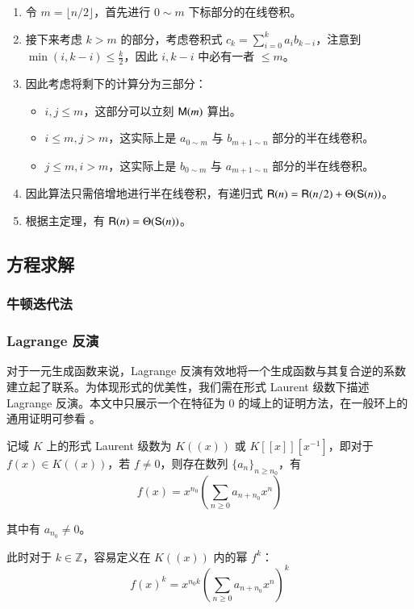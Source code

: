 \begin{enumerate}
\item 令 $m=\lfloor n/2\rfloor$，首先进行 $0\sim m$ 下标部分的在线卷积。
\item 接下来考虑 $k > m$ 的部分，考虑卷积式 $c_k = \sum_{i=0}^k a_ib_{k-i}$，注意到 $\min(i,k-i)\le \frac k2$，因此 $i,k-i$ 中必有一者 $\le m$。
\item 因此考虑将剩下的计算分为三部分：
\begin{itemize}
\item $i,j\le m$，这部分可以立刻 $\mathsf M(m)$ 算出。 
\item $i\le m,j>m$，这实际上是 $a_{0\sim m}$ 与 $b_{m+1\sim n}$ 部分的半在线卷积。
\item $j\le m,i>m$，这实际上是 $b_{0\sim m}$ 与 $a_{m+1\sim n}$ 部分的半在线卷积。
\end{itemize}
\item 因此算法只需倍增地进行半在线卷积，有递归式 $\mathsf R(n) = \mathsf R(n/2) + \Theta(\mathsf S(n))$。
\item 根据主定理，有 $\mathsf R(n)=\Theta(\mathsf S(n))$。
\end{enumerate}

\subsection{方程求解}

\subsubsection{牛顿迭代法}

\subsubsection{Lagrange 反演}

对于一元生成函数来说，Lagrange 反演有效地将一个生成函数与其复合逆的系数建立起了联系。为体现形式的优美性，我们需在形式 Laurent 级数下描述 Lagrange 反演。本文中只展示一个在特征为 $0$ 的域上的证明方法，在一般环上的通用证明可参看 \cite[Sec. 1.2]{combenum}。

\begin{definition}[形式 Laurent 级数]
记域 $K$ 上的形式 Laurent 级数为 $K((x))$ 或 $K[[x]][x^{-1}]$，即对于 $f(x) \in K((x))$，若 $f\neq 0$，则存在数列 $\{a_n\}_{n\ge n_0}$，有
$$
f(x) = x^{n_0} \left(\sum_{n\ge 0} a_{n+n_0} x^n\right)
$$

其中有 $a_{n_0} \neq 0$。

此时对于 $k\in \mathbb Z$，容易定义在 $K((x))$ 内的幂 $f^k$：
$$
f(x)^k = x^{n_0 k} \left(\sum_{n\ge 0} a_{n+n_0} x^n\right)^k
$$
\end{definition}


